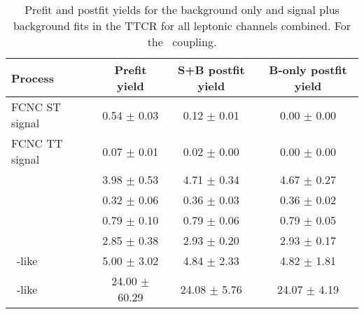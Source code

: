 \begin{table}[htbp]
	\centering
	\caption{Prefit and postfit yields for the background only and signal plus background fits in the TTCR for all leptonic channels combined. For the \kZut\ coupling.}
	\begin{tabular}{lccc}
		\toprule
		Process & Prefit yield & S+B postfit yield & B-only postfit yield \\
		\midrule
		FCNC ST signal \kZut\          &    0.54 $\pm$    0.03 &     0.12 $\pm$    0.01 &     0.00 $\pm$    0.00 \\
		FCNC TT signal \kZut\          &    0.07 $\pm$    0.01 &     0.02 $\pm$    0.00 &     0.00 $\pm$    0.00 \\
		\WZ\                           &    3.98 $\pm$    0.53 &     4.71 $\pm$    0.34 &     4.67 $\pm$    0.27 \\
		\ZZ\                           &    0.32 $\pm$    0.06 &     0.36 $\pm$    0.03 &     0.36 $\pm$    0.02 \\
		\tZq\                          &    0.79 $\pm$    0.10 &     0.79 $\pm$    0.06 &     0.79 $\pm$    0.05 \\
		\ttZ\                          &    2.85 $\pm$    0.38 &     2.93 $\pm$    0.20 &     2.93 $\pm$    0.17 \\
		\NPE\ \ttbar -like             &    5.00 $\pm$    3.02 &     4.84 $\pm$    2.33 &     4.82 $\pm$    1.81 \\
		\NPM\ \ttbar -like             &   24.00 $\pm$   60.29 &    24.08 $\pm$    5.76 &    24.07 $\pm$    4.19 \\
		\bottomrule
	\end{tabular}
	\label{tab:PrePostAllTTCR}
\end{table}

